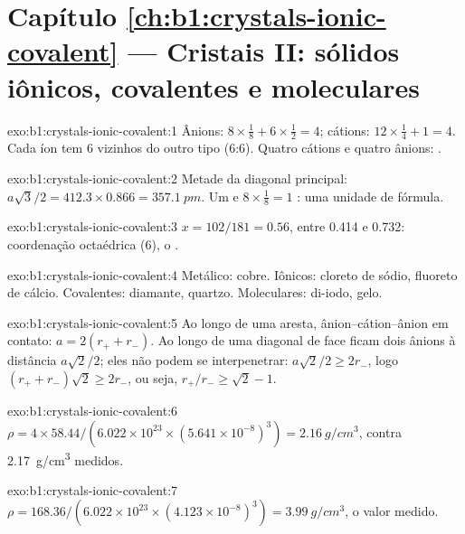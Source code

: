 \section*{Capítulo \ref{ch:b1:crystals-ionic-covalent} --- Cristais II: sólidos iônicos, covalentes e moleculares}

\begin{solution}{exo:b1:crystals-ionic-covalent:1}
Ânions: $8 \times \frac18 + 6 \times \frac12 = 4$; cátions: $12 \times
\frac14 + 1 = 4$. Cada íon tem 6 vizinhos do outro tipo (6:6). Quatro
cátions e quatro ânions: .
\end{solution}

\begin{solution}{exo:b1:crystals-ionic-covalent:2}
Metade da diagonal principal: $a\sqrt3/2 = 412.3 \times 0.866 = \qty{357.1}{pm}$.
Um  e $8 \times \frac18 = 1$ : uma unidade de fórmula.
\end{solution}

\begin{solution}{exo:b1:crystals-ionic-covalent:3}
$x = 102/181 = 0.56$, entre 0.414 e 0.732: coordenação octaédrica
(6), o .
\end{solution}

\begin{solution}{exo:b1:crystals-ionic-covalent:4}
Metálico: cobre. Iônicos: cloreto de sódio, fluoreto de cálcio.
Covalentes: diamante, quartzo. Moleculares: di-iodo, gelo.
\end{solution}

\begin{solution}{exo:b1:crystals-ionic-covalent:5}
Ao longo de uma aresta, ânion--cátion--ânion em contato: $a = 2(r_+ + r_-)$.
Ao longo de uma diagonal de face ficam dois ânions à distância
$a\sqrt2/2$; eles não podem se interpenetrar: $a\sqrt2/2 \ge 2r_-$, logo
$(r_+ + r_-)\sqrt2 \ge 2r_-$, ou seja,
$r_+/r_- \ge \sqrt2 - 1$.
\end{solution}

\begin{solution}{exo:b1:crystals-ionic-covalent:6}
$\rho = 4 \times 58.44/(6.022 \times 10^{23} \times (5.641 \times
10^{-8})^3) = \qty{2.16}{g/cm^3}$, contra \qty{2.17}{g/cm^3} medidos.
\end{solution}

\begin{solution}{exo:b1:crystals-ionic-covalent:7}
$\rho = 168.36/(6.022 \times 10^{23} \times (4.123 \times 10^{-8})^3) =
\qty{3.99}{g/cm^3}$, o valor medido.
\end{solution}

